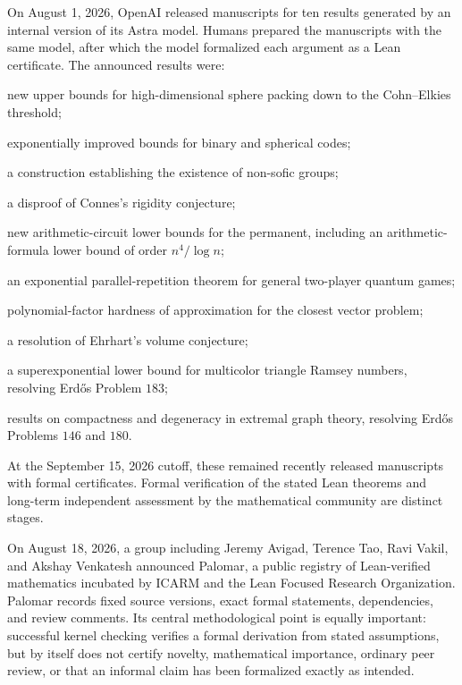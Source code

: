     \begin{fact}
        On August 1, 2026, OpenAI released manuscripts for ten results generated
        by an internal version of its Astra model. Humans prepared the
        manuscripts with the same model, after which the model formalized each
        argument as a Lean certificate. The announced results were:
        \begin{bookitems}
            \item new upper bounds for high-dimensional sphere packing down to
                  the Cohn--Elkies threshold;
            \item exponentially improved bounds for binary and spherical codes;
            \item a construction establishing the existence of non-sofic groups;
            \item a disproof of Connes's rigidity conjecture;
            \item new arithmetic-circuit lower bounds for the permanent,
                  including an arithmetic-formula lower bound of order
                  $n^4/\log n$;
            \item an exponential parallel-repetition theorem for general
                  two-player quantum games;
            \item polynomial-factor hardness of approximation for the closest
                  vector problem;
            \item a resolution of Ehrhart's volume conjecture;
            \item a superexponential lower bound for multicolor triangle Ramsey
                  numbers, resolving Erd\H{o}s Problem $183$;
            \item results on compactness and degeneracy in extremal graph theory,
                  resolving Erd\H{o}s Problems $146$ and $180$.
        \end{bookitems}
        At the September 15, 2026 cutoff, these remained recently
        released manuscripts with formal certificates. Formal verification of
        the stated Lean theorems and
        long-term independent assessment by the mathematical community are
        distinct stages.
    \end{fact}

    \begin{fact}
        On August 18, 2026, a group including Jeremy Avigad, Terence Tao, Ravi
        Vakil, and Akshay Venkatesh announced Palomar, a public registry of
        Lean-verified mathematics incubated by ICARM and the Lean Focused
        Research Organization. Palomar records fixed source versions, exact
        formal statements, dependencies, and review comments. Its central
        methodological point is equally important: successful kernel checking
        verifies a formal derivation from stated assumptions, but by itself does
        not certify novelty, mathematical importance, ordinary peer review, or
        that an informal claim has been formalized exactly as intended.
    \end{fact}


